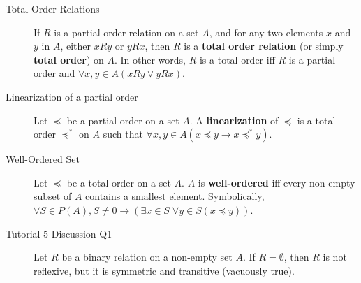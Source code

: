 \documentclass{article}
\begin{document}
\begin{description}
	\item[Total Order Relations]If $R$ is a partial order relation on a set $A$, and for any two elements $x$ and $y$ in $A$, either $xRy$ or $yRx$, then $R$ is a \textbf{total order relation} (or simply \textbf{total order}) on $A$. In other words, $R$ is a total order iff $R$ is a partial order and $\forall x,y\in A(xRy\lor yRx)$.
	\item[Linearization of a partial order]Let $\preceq$ be a partial order on a set $A$. A \textbf{linearization} of $\preceq$ is a total order $\preceq^{*}$ on $A$ such that $\forall x,y\in A(x\preceq y \to x\preceq^{*} y)$.
	\item[Well-Ordered Set] Let $\preceq$ be a total order on a set $A$. $A$ is \textbf{well-ordered} iff every non-empty subset of $A$ contains a smallest element. Symbolically, $\forall S\in P(A), S\neq 0\to (\exists x\in S\;\forall y\in S(x\preceq y))$.
	\item[Tutorial 5 Discussion Q1] Let $R$ be a binary relation on a non-empty set $A$. If $R=\emptyset$, then $R$ is not reflexive, but it is symmetric and transitive (vacuously true).
	

\end{description}
\end{document}
